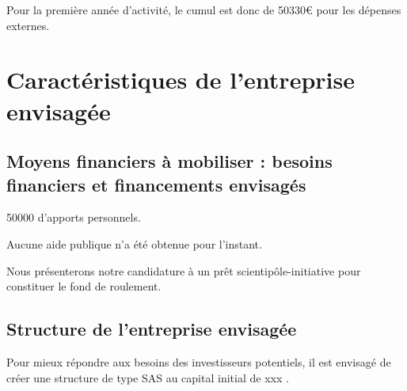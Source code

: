 \documentclass[a4paper,10pt]{scrreprt}
\begin{document}
            \medskip
            Pour la première année d'activité, le cumul est donc de 50330€ pour les dépenses externes.
        
            
\chapter{Caractéristiques de l’entreprise envisagée}

    
    \section{Moyens financiers à mobiliser : besoins financiers et financements envisagés}
        
        50000\texteuro{} d'apports personnels.
        
        Aucune aide publique n'a été obtenue pour l'instant.

        Nous présenterons notre candidature à un prêt scientipôle-initiative pour constituer le fond de roulement.
        
    
    \section{Structure de l’entreprise envisagée}

        Pour mieux répondre aux besoins des investisseurs potentiels, il est envisagé de créer une structure de type SAS au capital initial de xxx \texteuro.
\end{document}
